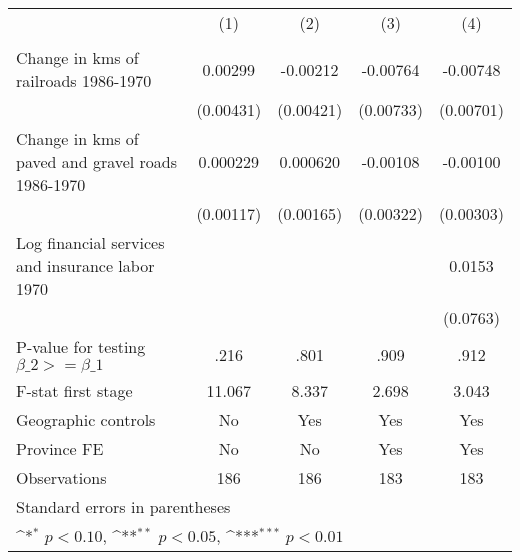 {
\def\sym#1{\ifmmode^{#1}\else\(^{#1}\)\fi}
\begin{tabular}{l*{4}{c}}
\hline\hline
                &\multicolumn{1}{c}{(1)}&\multicolumn{1}{c}{(2)}&\multicolumn{1}{c}{(3)}&\multicolumn{1}{c}{(4)}\\
                &\multicolumn{1}{c}{}&\multicolumn{1}{c}{}&\multicolumn{1}{c}{}&\multicolumn{1}{c}{}\\
\hline
Change in kms of railroads 1986-1970&  0.00299         & -0.00212         & -0.00764         & -0.00748         \\
                &(0.00431)         &(0.00421)         &(0.00733)         &(0.00701)         \\
[1em]
Change in kms of paved and gravel roads 1986-1970& 0.000229         & 0.000620         & -0.00108         & -0.00100         \\
                &(0.00117)         &(0.00165)         &(0.00322)         &(0.00303)         \\
[1em]
Log financial services and insurance labor 1970&                  &                  &                  &   0.0153         \\
                &                  &                  &                  & (0.0763)         \\
\hline
P-value for testing $\beta\_{2} >= \beta\_{1}$&     .216         &     .801         &     .909         &     .912         \\
F-stat first stage&   11.067         &    8.337         &    2.698         &    3.043         \\
Geographic controls&       No         &      Yes         &      Yes         &      Yes         \\
Province FE     &       No         &       No         &      Yes         &      Yes         \\
Observations    &      186         &      186         &      183         &      183         \\
\hline\hline
\multicolumn{5}{l}{\footnotesize Standard errors in parentheses}\\
\multicolumn{5}{l}{\footnotesize \sym{*} \(p<0.10\), \sym{**} \(p<0.05\), \sym{***} \(p<0.01\)}\\
\end{tabular}
}
